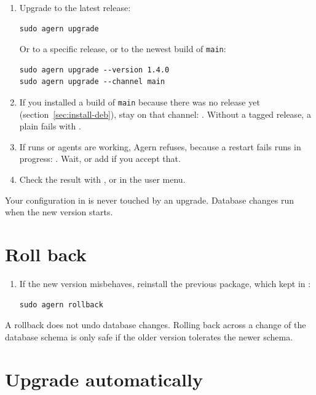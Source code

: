 \begin{enumerate}
  \item Upgrade to the latest release:
\begin{lstlisting}
sudo agern upgrade
\end{lstlisting}
    Or to a specific release, or to the newest build of \texttt{main}:
\begin{lstlisting}
sudo agern upgrade --version 1.4.0
sudo agern upgrade --channel main
\end{lstlisting}
  \item If you installed a build of \texttt{main} because there was no release yet
    (section~\ref{sec:install-deb}), stay on that channel: .
    Without a tagged release, a plain  fails with
    .
  \item If runs or agents are working, Agern refuses, because a restart fails runs in progress:
    . Wait, or add
     if you accept that.
  \item Check the result with , or in the user menu.
\end{enumerate}

Your configuration in  is never touched by an upgrade. Database changes
run when the new version starts.

\section{Roll back}\label{sec:rollback}

\begin{enumerate}
  \item If the new version misbehaves, reinstall the previous package, which 
    kept in :
\begin{lstlisting}
sudo agern rollback
\end{lstlisting}
\end{enumerate}

A rollback does not undo database changes. Rolling back across a change of the database schema is
only safe if the older version tolerates the newer schema.

\section{Upgrade automatically}\label{sec:auto-upgrade}

